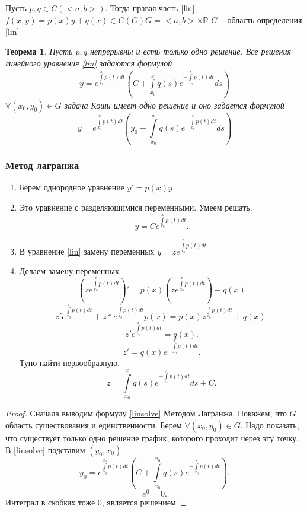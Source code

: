 \documentclass[14pt]{extarticle}
\newtheorem{theorem}{Теорема}
\begin{document}
\subsection{}
Пусть $p,q \in C(<a,b>)$. Тогда правая часть  $\ref{lin}$
$f(x,y) = p(x) y + q(x) \in C(G) G = <a,b> \times \mathbb{R}$ $G$ -- область определения \ref{lin}
\begin{theorem}
	Пусть $p,q$ непрерывны и есть только одно решение. Все решения линейного уравнения \ref{lin} задаются формулой
	\begin{eqnarray}\label{linsolve}
		y = e^{\int\limits_{x_0}^{x} p(t) dt } (C +\int\limits_{x_0}^{x} q(s) e^{-\int\limits_{x_0}^{s} p(t) dt } ds  )
	\end{eqnarray}
	$\forall  (x_0,y_0) \in G$ задача Коши имеет одно решение и оно задается формулой
	\begin{equation}
		y = e^{\int\limits_{x_0}^{x} p(t) dt } (y_0 +\int\limits_{x_0}^{x} q(s) e^{-\int\limits_{x_0}^{s} p(t) dt } ds  )
	\end{equation}
\end{theorem}
\subsubsection{Метод лагранжа}
\begin{enumerate}
	\item Берем однородное уравнение $y' = p(x) y$
	\item Это уравнение с разделяющимися переменными. Умеем решать.
	      \[
		      y = Ce^{\int\limits_{x_0}^{x} p(t) dt }
		      .\]
	\item В уравнение \ref{lin} замену переменных $y = z e^{\int\limits_{x_0}^{x} p(t)dt }$
	\item Делаем замену переменных
	      \begin{equation}
		      (z  e ^{\int\limits_{x_0}^{x} p(t) dt })' =
		      p(x) (z e^{\int\limits_{x_0}^{x} p(t) dt  }) + q(x)
	      \end{equation}
	      \[
		      z' e^{\int\limits_{x_0}^{x} p(t) dt } + z * e^{\int\limits_{x_0}^{x} p(t) dt } p(x) = p(x) z^{\int\limits_{x_0}^{x} p(t) dt  } + q(x)
		      .\]
	      \[
		      z' e^{\int\limits_{x_0}^{x} p(t) dt } = q(x)
		      .\]
	      \[
		      z' = q(x) e^{-\int\limits_{x_0}^{x} p(t) dt }
		      .\]
	      Тупо найти первообразную.
	      \[
		      z = \int\limits_{x_0}^{x}  q(s) e^{-\int\limits_{x_0}^{s} p(t) dt  }  ds + C
		      .\]
\end{enumerate}
\begin{proof}
	Сначала выводим формулу \ref{linsolve} Методом Лагранжа. Покажем, что $G$
	область существования и единственности. Берем  $\forall  (x_0,y_0) \in G$. Надо показать, что существует только одно решение график, которого проходит через эту точку. В \ref{linsolve} подставим $(y_0,x_0)$
	\[
		y_0 = e^{\int\limits_{x_0}^{x_0} p(t) dt } ( C + \int\limits_{x_0}^{x_0} q(s)
		e^{-\int\limits_{x_0}^{s} p(t) dt  })
		.\]
	\[
		e^{0} = 0
		.\]
	Интеграл в скобках тоже 0, является решением
\end{proof}
\end{document}
